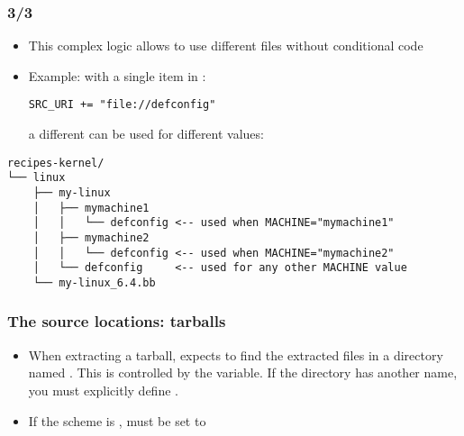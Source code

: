 \begin{frame}[fragile]
  \frametitle{ 3/3}
  \begin{itemize}
    \item This complex logic allows to use different files without
      conditional code
    \item Example: with a single item in :
      \begin{block}{}
        \begin{verbatim}
SRC_URI += "file://defconfig"
        \end{verbatim}
      \end{block}
    a different  can be used for different 
      values:
  \end{itemize}
  \begin{center}
  \begin{minipage}{0.6\textwidth}
    \fontsize{8}{8}\selectfont
    \begin{verbatim}
recipes-kernel/
└── linux
    ├── my-linux
    │   ├── mymachine1
    │   │   └── defconfig <-- used when MACHINE="mymachine1"
    │   ├── mymachine2
    │   │   └── defconfig <-- used when MACHINE="mymachine2"
    │   └── defconfig     <-- used for any other MACHINE value
    └── my-linux_6.4.bb
    \end{verbatim}
  \end{minipage}
  \end{center}
\end{frame}

\begin{frame}
  \frametitle{The source locations: tarballs}
  \begin{itemize}
    \item When extracting a tarball,  expects to find the
      extracted files in a directory named
      . This is controlled by the
       variable. If the directory has another name, you must
      explicitly define .
    \item If the scheme is ,  must be set to
  \end{itemize}
\end{frame}

